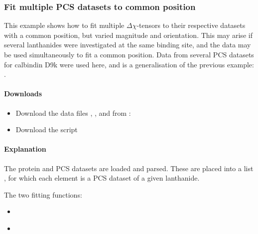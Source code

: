\documentclass[a4paper,10pt,english,openany,oneside]{sphinxmanual}
\begin{document}
\subsubsection{Fit multiple PCS datasets to common position}
\label{\detokenize{examples/pcs_fit_multiple:fit-multiple-pcs-datasets-to-common-position}}\label{\detokenize{examples/pcs_fit_multiple:pcs-fit-multiple}}\label{\detokenize{examples/pcs_fit_multiple::doc}}
This example shows how to fit multiple \({\Delta\chi}\)-tensors to their respective datasets with a common position, but varied magnitude and orientation. This may arise if several lanthanides were investigated at the same binding site, and the data may be used simultaneously to fit a common position. Data from several PCS datasets for calbindin D9k were used here, and is a generalisation of the previous example: {\hyperref[\detokenize{examples/pcs_fit:pcs-fit}]{}}.


\paragraph{Downloads}
\label{\detokenize{examples/pcs_fit_multiple:downloads}}\begin{itemize}
\item {} 
Download the data files , ,  and  from :

\item {} 
Download the script 

\end{itemize}


\paragraph{Explanation}
\label{\detokenize{examples/pcs_fit_multiple:explanation}}
The protein and PCS datasets are loaded and parsed. These are placed into a list , for which each element is a PCS dataset of a given lanthanide.

The two fitting functions:
\begin{itemize}
\item {} 
{\hyperref[\detokenize{reference/generated/paramagpy.fit.svd_gridsearch_fit_metal_from_pcs:paramagpy.fit.svd_gridsearch_fit_metal_from_pcs}]{}}

\item {} 
{\hyperref[\detokenize{reference/generated/paramagpy.fit.nlr_fit_metal_from_pcs:paramagpy.fit.nlr_fit_metal_from_pcs}]{}}

\end{itemize}
\end{document}
